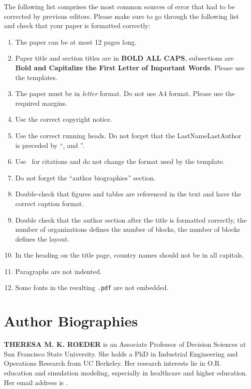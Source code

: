\documentclass{scspaperproc}
\theoremstyle{scsthe}
\begin{document}
The following list comprises the most common sources of error that had to be corrected by previous editors. Please make sure to go through the following list and check that your paper is formatted correctly:
\begin{enumerate}
	\item	The paper can be at most 12 pages long.
	\item	Paper title and section titles are in \textbf{BOLD ALL CAPS}, subsections are \textbf{Bold and Capitalize the First Letter of Important Words}. Please use the templates.
	\item	The paper must be in \emph{letter} format. Do not use A4 format. Please use the required margins.
	\item	Use the correct copyright notice.
	\item	Use the correct running heads. Do not forget that the LastNameLastAuthor is preceded by ``, and ''.
	\item	Use \BibTeX\ for citations and do not change the format used by the template.
	\item	Do not forget the ``author biographies'' section.
	\item	Double-check that figures and tables are referenced in the text and have the correct caption format.
	\item	Double check that the author section after the title is formatted correctly, the number of organizations defines the number of blocks, the number of blocks defines the layout.
	\item	In the heading on the title page, country names should not be in all capitals.
	\item	Paragraphs are not indented.
	\item  Some fonts in the resulting \texttt{.pdf} are not embedded.
\end{enumerate}





\section*{Author Biographies}

\textbf{\uppercase{THERESA M. K. ROEDER}} is an Associate Professor of Decision Sciences at San Francisco State University. She holds a PhD in Industrial Engineering and Operations Research from UC Berkeley. Her research interests lie in O.R. education and simulation modeling, especially in healthcare and higher education. Her email address is .
\end{document}
